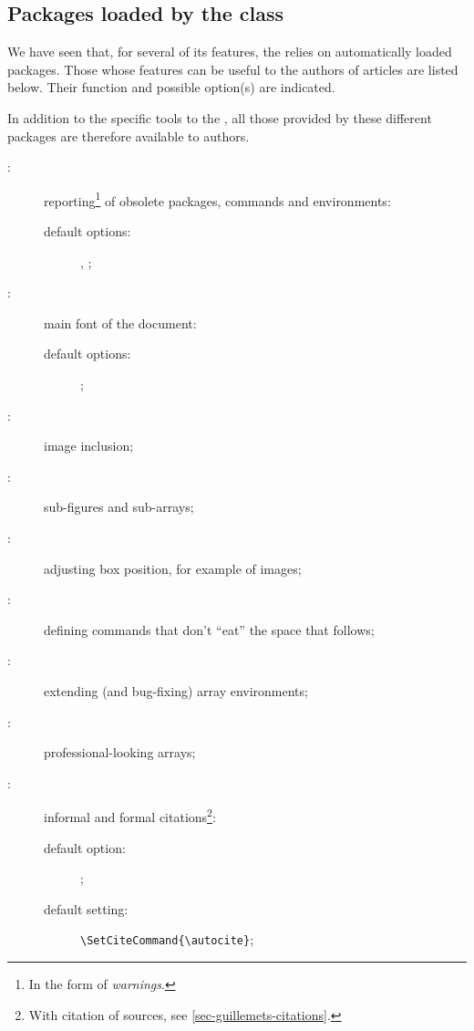 \documentclass[english,nolocaltoc]{nwejmart}
\newtheorem[style=definition]{fact}
\newtheorem[title=experience]{experience}
\newtheorem[title-plural=rings]{ring}
\newtheorem[title=ideal,title-plural=ideals]{ideal}
\begin{document}
\subsection{Packages loaded by the class}\label{sec:packages-charges-par}

We have seen that, for several of its features, the  \nwejmauthorcl{}
relies on automatically loaded packages. Those whose features can be
useful to the authors of  \nwejm{}  articles are listed below. Their
function and possible option(s) are indicated.

In addition to the specific tools to the \nwejmauthorcl, all those
provided by these different packages are therefore available to \nwejm{}
authors.

\begin{description}
\item[:] reporting\footnote{In the form of  \emph{warnings}.} of obsolete  packages, commands and environments:
  \begin{description}
  \item[default options:] , ;
  \end{description}
\item[ :] main font of the document:
  \begin{description}
  \item[default options:] ;
  \end{description}
\item[:] image inclusion;
\item[:] sub-figures and sub-arrays;
\item[:] adjusting box position, for example of images;
\item[:] defining commands that don't  \enquote{eat}
  the space that follows;
\item[:] extending (and bug-fixing) array  environments;
\item[:] professional-looking arrays;
\item[:] informal and formal citations\footnote{With
     citation of sources,
    see \vref{sec-guillemets-citations}.}:
    \begin{description}
    \item[default  option:] ;
    \item[default setting:]
      \lstinline[alsolanguage={[csquotes]TeX},alsolanguage={[biblatex]TeX}]×\SetCiteCommand{\autocite}×;

\end{description}
\end{description}
\end{document}
